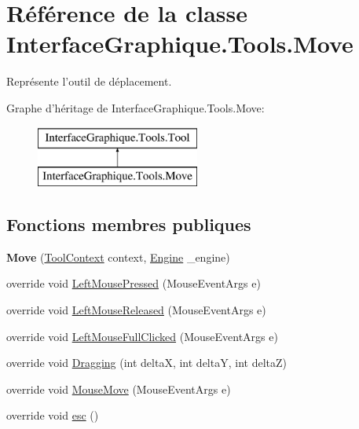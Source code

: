 \hypertarget{class_interface_graphique_1_1_tools_1_1_move}{\section{Référence de la classe Interface\-Graphique.\-Tools.\-Move}
\label{class_interface_graphique_1_1_tools_1_1_move}
}


Représente l'outil de déplacement.  


Graphe d'héritage de Interface\-Graphique.\-Tools.\-Move\-:\begin{figure}[H]
\begin{center}
\leavevmode
\includegraphics[height=2.000000cm]{class_interface_graphique_1_1_tools_1_1_move}
\end{center}
\end{figure}
\subsection*{Fonctions membres publiques}
\begin{DoxyCompactItemize}
\item 
\hypertarget{class_interface_graphique_1_1_tools_1_1_move_ade192adcdcb499de8132031dcf999563}{{\bfseries Move} (\hyperlink{class_interface_graphique_1_1_tools_1_1_tool_context}{Tool\-Context} context, \hyperlink{class_interface_graphique_1_1_engine}{Engine} \-\_\-engine)}\label{class_interface_graphique_1_1_tools_1_1_move_ade192adcdcb499de8132031dcf999563}

\item 
override void \hyperlink{class_interface_graphique_1_1_tools_1_1_move_a9bb3775998416ea36c2ca7009f37a6d9}{Left\-Mouse\-Pressed} (Mouse\-Event\-Args e)
\item 
override void \hyperlink{class_interface_graphique_1_1_tools_1_1_move_abff4c343d842c5513749a8c1f4c35338}{Left\-Mouse\-Released} (Mouse\-Event\-Args e)
\item 
override void \hyperlink{class_interface_graphique_1_1_tools_1_1_move_ab3c7919f138fa833fdf999adba7c8fdb}{Left\-Mouse\-Full\-Clicked} (Mouse\-Event\-Args e)
\item 
override void \hyperlink{class_interface_graphique_1_1_tools_1_1_move_ab6ce1689b59b7b60c55838ff344c8d7c}{Dragging} (int delta\-X, int delta\-Y, int delta\-Z)
\item 
override void \hyperlink{class_interface_graphique_1_1_tools_1_1_move_ab9f7749ef77fb21f385a9bc5b43bf234}{Mouse\-Move} (Mouse\-Event\-Args e)
\item 
override void \hyperlink{class_interface_graphique_1_1_tools_1_1_move_a72e41dcdef93cd060e499bd1f8683512}{esc} ()
\end{DoxyCompactItemize}
